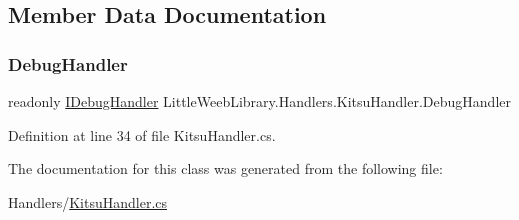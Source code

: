\subsection{Member Data Documentation}
\mbox{\label{class_little_weeb_library_1_1_handlers_1_1_kitsu_handler_a6d3c55fa5eee15320845c2d902c96882}} 
\subsubsection{\texorpdfstring{Debug\+Handler}{DebugHandler}}
{\footnotesize\ttfamily readonly \mbox{\hyperlink{interface_little_weeb_library_1_1_handlers_1_1_i_debug_handler}{I\+Debug\+Handler}} Little\+Weeb\+Library.\+Handlers.\+Kitsu\+Handler.\+Debug\+Handler\hspace{0.3cm}{\ttfamily [private]}}



Definition at line 34 of file Kitsu\+Handler.\+cs.



The documentation for this class was generated from the following file\+:\begin{DoxyCompactItemize}
\item 
Handlers/\mbox{\hyperlink{_kitsu_handler_8cs}{Kitsu\+Handler.\+cs}}\end{DoxyCompactItemize}
